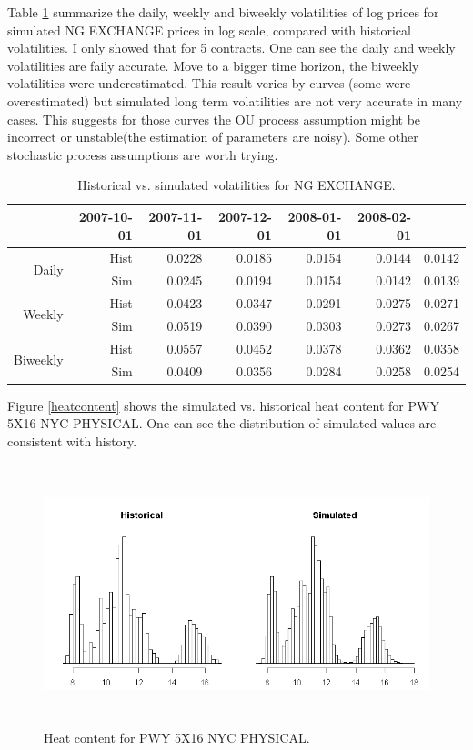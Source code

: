 Table \ref{tbl-ng-vol} summarize the daily, 
weekly and biweekly volatilities of log prices
for simulated NG EXCHANGE prices in log scale, compared with 
historical volatilities. I only showed that for 5 contracts.
One can see the daily and weekly volatilities are faily accurate.
Move to a bigger time horizon, the biweekly volatilities
were underestimated. This result veries by curves 
(some were overestimated) but simulated long term volatilities
are not very accurate in many cases.
This suggests for those curves the OU process assumption 
might be incorrect or unstable(the estimation
of parameters are noisy). 
Some other stochastic process assumptions are worth  trying. 

\begin{table}[htbp]
\begin{center}
\caption{Historical vs. simulated  volatilities for  NG EXCHANGE.}
\begin{tabular}{r|rrrrrr}
\hline
&  2007-10-01 & 2007-11-01 & 2007-12-01 & 2008-01-01 & 2008-02-01\\
  \hline
  \multirow{2}{*}{Daily} & 
  Hist & 0.0228 &  0.0185 &   0.0154 &  0.0144 &  0.0142  \\
 & Sim & 0.0245 &   0.0194 &   0.0154 &  0.0142  & 0.0139 \\ \hline \hline
  \multirow{2}{*}{Weekly} & 
  Hist & 0.0423 &   0.0347 & 0.0291 &  0.0275 &  0.0271 \\
   & Sim & 0.0519 &   0.0390 &   0.0303 &  0.0273 &   0.0267 \\ \hline \hline 
  \multirow{2}{*}{Biweekly} & 
  Hist & 0.0557  & 0.0452 &   0.0378 &   0.0362 &   0.0358 \\
  & Sim & 0.0409 &   0.0356 &   0.0284 &   0.0258 &   0.0254  \\
   \hline
\end{tabular}
\end{center}
\label{tbl-ng-vol}
\end{table}

Figure \ref{heatcontent} shows the simulated vs. historical 
heat content for PWY 5X16 NYC PHYSICAL. One can see the 
distribution of simulated values are consistent with
history.
\begin{figure}[htbp]
\centering
\includegraphics[width=6in, height=3in]{figures/heatcontent-pwy.png}
\caption{Heat content for PWY 5X16 NYC PHYSICAL.}
\label{three-ng}
\end{figure}



